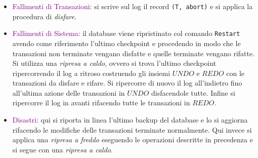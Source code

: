 \begin{itemize}
    \item \textcolor{purple}{Fallimenti di Transazioni}: si scrive sul log il
        record \verb|(T, abort)| e si applica la procedura di \emph{disfare}.
    \item \textcolor{purple}{Fallimenti di Sistema}: il database viene ripristinato col comando
        \verb|Restart| avendo come riferimento l'ultimo checkpoint e procedendo in modo
        che le transazioni non terminate vengano disfatte e quelle terminate vengano rifatte.
        Si utilizza una \emph{ripresa a caldo}, ovvero si trova l'ultimo checkpoint ripercorrendo
        il log a ritroso costruendo gli insiemi $UNDO$ e $REDO$ con le transazioni da disfare e rifare.
        Si ripercorre di nuovo il log all'indietro fino all'ultima azione delle transazioni
        in $UNDO$ disfacendole tutte. Infine si ripercorre il log in avanti rifacendo tutte le transazioni
        in $REDO$.
    \item \textcolor{purple}{Disastri}: qui si riporta in linea l'ultimo backup del database e lo
        si aggiorna rifacendo le modifiche delle transazioni terminate normalmente.
        Qui invece si applica una \emph{ripresa a freddo} eseguendo le operazioni descritte in precedenza
        e si segue con una \emph{ripresa a caldo}.
\end{itemize}